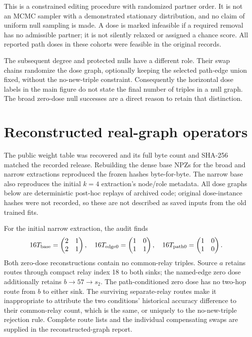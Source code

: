 \documentclass[10pt,letterpaper]{article}
\begin{document}
This is a constrained editing procedure with randomized partner order.
It is not an MCMC sampler with a demonstrated stationary distribution,
and no claim of uniform null sampling is made. A dose is marked
infeasible if a required removal has no admissible partner; it is not
silently relaxed or assigned a chance score. All reported path doses
in these cohorts were feasible in the original records.

The subsequent degree and protected nulls have a different role. Their
swap chains randomize the dose graph, optionally keeping the selected
path-edge union fixed, without the no-new-triple constraint. Consequently
the horizontal dose labels in the main figure do not state the final
number of triples in a null graph. The broad zero-dose null successes
are a direct reason to retain that distinction.

\section{Reconstructed real-graph operators}

The public weight table was recovered and its full byte count and SHA-256
matched the recorded release. Rebuilding the dense base NPZs for the broad
and narrow extractions reproduced the frozen hashes byte-for-byte. The
narrow base also reproduces the initial $k=4$ extraction's node/role
metadata. All dose graphs below are deterministic post-hoc replays of
archived code; original dose-instance hashes were not recorded, so these
are not described as saved inputs from the old trained fits.

For the initial narrow extraction, the audit finds
\[
16T_{\rm base}=\begin{pmatrix}2&1\\2&1\end{pmatrix},\quad
16T_{\rm edge0}=\begin{pmatrix}1&0\\1&1\end{pmatrix},\quad
16T_{\rm path0}=\begin{pmatrix}1&0\\1&0\end{pmatrix}.
\]
Both zero-dose reconstructions contain no common-relay triples. Source
$a$ retains routes through compact relay index 18 to both sinks; the
named-edge zero dose additionally retains $b\to57\to s_2$. The
path-conditioned zero dose has no two-hop route from $b$ to either sink.
The surviving separate-relay routes make it inappropriate to attribute
the two conditions' historical accuracy difference to their common-relay
count, which is the same, or uniquely to the no-new-triple rejection rule.
Complete route lists and the individual compensating swaps are supplied
in the reconstructed-graph report.
\end{document}
